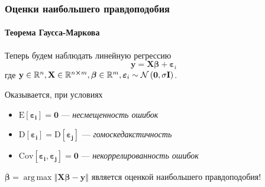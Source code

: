 \documentclass[notheorems,aspectratio=169]{beamer}
\DeclareMathOperator*{\argmax}{arg\,max}
\begin{document}

\begin{frame}
  \frametitle{Оценки наибольшего правдоподобия}
  \framesubtitle{Теорема Гаусса-Маркова}
  Теперь будем наблюдать линейную регрессию 
  $$\mathbf{y}=\mathbf{X}\boldsymbol{\beta}+\boldsymbol{\varepsilon}_i$$
  где $\mathbf{y}\in\mathbb{R}^n, \mathbf{X}\in\mathbb{R}^{n\cross m}, \boldsymbol{\beta}\in\mathbb{R}^m, \boldsymbol{\varepsilon}_i\sim\mathcal{N}\left(\mathbf{0},\sigma \mathbf{I}\right)$.

  Оказывается, при условиях

  \begin{itemize}
    \item $\mathrm{E}\left[\boldsymbol{\varepsilon_i}\right]=\mathbf{0}$ --- \emph{несмещенность ошибок}
    \item $\mathrm{D}\left[\boldsymbol{\varepsilon_i}\right]=\mathrm{D}\left[\boldsymbol{\varepsilon_j}\right]$ --- \emph{гомоскедакстичность}
   \item $\mathrm{Cov}\left[\boldsymbol{\varepsilon_i},\boldsymbol{\varepsilon_j}\right]=\mathbf{0}$ --- \emph{некоррелированность ошибок}
  \end{itemize}

  $\overline{\boldsymbol{\beta}}=\argmax{\left\Vert\mathbf{X}\boldsymbol{\beta}-\mathbf{y}\right\Vert}$ является оценкой наибольшего правдоподобия!
\end{frame}
\end{document}
